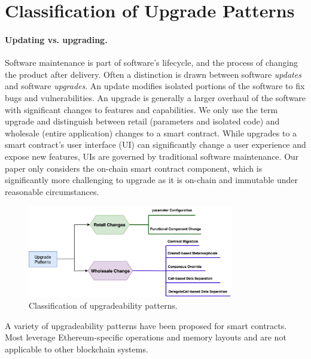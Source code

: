 
\section{Classification of Upgrade Patterns} \label{sec:classification}

\paragraph{Updating vs. upgrading.} Software maintenance is part of software's lifecycle, and the process of changing the product after delivery. Often a distinction is drawn between software \textit{updates} and software \textit{upgrades}. An update modifies isolated portions of the software to fix bugs and vulnerabilities. An upgrade is generally a larger overhaul of the software with significant changes to features and capabilities. We only use the term upgrade and distinguish between retail (parameters and isolated code) and wholesale (entire application) changes to a smart contract. While upgrades to a smart contract's user interface (UI) can significantly change a user experience and expose new features, UIs are governed by traditional software maintenance. Our paper only considers the on-chain smart contract component, which is significantly more challenging to upgrade as it is on-chain and immutable under reasonable circumstances.

\begin{figure}[t]
  \centering
      \includegraphics[width=0.8\textwidth]{figures/New_Classification.png}
  \caption{Classification of upgradeability patterns.\label{fig:class}}
 \end{figure}
 
A variety of upgradeability patterns have been proposed for smart contracts. Most leverage Ethereum-specific operations and memory layouts and are not applicable to other blockchain systems.



